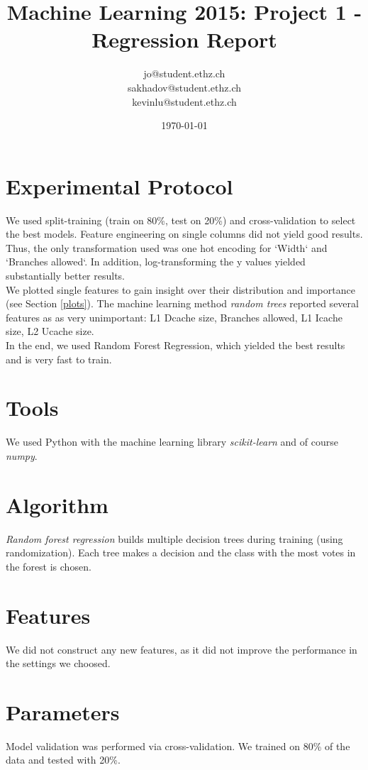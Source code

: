 \documentclass[a4paper, 11pt]{article}
\title{Machine Learning 2015: Project 1 - Regression Report}
\author{jo@student.ethz.ch\\ sakhadov@student.ethz.ch\\ kevinlu@student.ethz.ch\\}
\date{\today}
\begin{document}
\maketitle

\section*{Experimental Protocol}
We used split-training (train on 80\%, test on 20\%) and cross-validation to select the best models.
Feature engineering on single columns did not yield good results.
Thus, the only transformation used was one hot encoding for `Width` and `Branches allowed`. In addition, log-transforming the y values yielded substantially better results.\\
We plotted single features to gain insight over their distribution and importance (see Section \ref{plots}).
The machine learning method \textit{random trees} reported several features as as very unimportant: L1 Dcache size, Branches allowed, L1 Icache size, L2 Ucache size.\\
In the end, we used Random Forest Regression, which yielded the best results and is very fast to train.

\section{Tools}
We used Python with the machine learning library \textit{scikit-learn} and of course \textit{numpy}.

\section{Algorithm}
\textit{Random forest regression} builds multiple decision trees during training (using randomization). Each tree makes a decision and the class with the most votes in the forest is chosen.

\section{Features}
We did not construct any new features, as it did not improve the performance in the settings we choosed.

\section{Parameters}
Model validation was performed via cross-validation. We trained on 80\% of the data and tested with 20\%.
\end{document}
